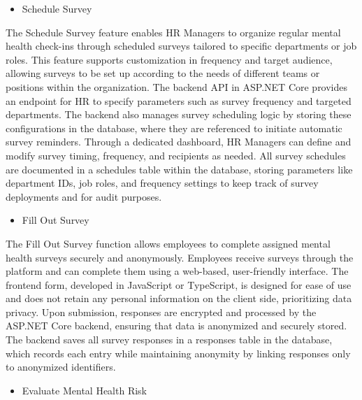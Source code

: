 \documentclass[conference]{IEEEtran}
\begin{document}
    \begin{itemize}
        \item Schedule Survey 
        \end{itemize}

    The Schedule Survey feature enables HR Managers to organize 
    regular mental health check-ins through scheduled surveys 
    tailored to specific departments or job roles. This feature 
    supports customization in frequency and target audience, 
    allowing surveys to be set up according to the needs of 
    different teams or positions within the organization. The 
    backend API in ASP.NET Core provides an endpoint for HR to 
    specify parameters such as survey frequency and targeted 
    departments. The backend also manages survey scheduling 
    logic by storing these configurations in the database, where 
    they are referenced to initiate automatic survey reminders. 
    Through a dedicated dashboard, HR Managers can define and 
    modify survey timing, frequency, and recipients as needed. 
    All survey schedules are documented in a schedules table 
    within the database, storing parameters like department IDs, 
    job roles, and frequency settings to keep track of survey 
    deployments and for audit purposes.
    \newline
   
    \begin{itemize}
        \item Fill Out Survey 
    \end{itemize}

    The Fill Out Survey function allows employees to complete 
    assigned mental health surveys securely and anonymously. 
    Employees receive surveys through the platform and can complete 
    them using a web-based, user-friendly interface. The frontend 
    form, developed in JavaScript or TypeScript, is designed for 
    ease of use and does not retain any personal information on 
    the client side, prioritizing data privacy. Upon submission, 
    responses are encrypted and processed by the ASP.NET Core 
    backend, ensuring that data is anonymized and securely stored. 
    The backend saves all survey responses in a responses table in 
    the database, which records each entry while maintaining 
    anonymity by linking responses only to anonymized identifiers.
    \newline    

    \begin{itemize}
        \item Evaluate Mental Health Risk
    \end{itemize}
    
\end{document}
